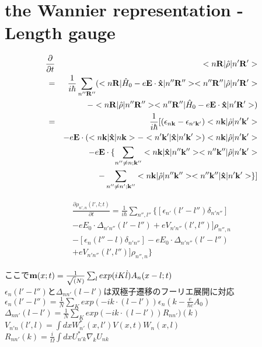 \documentclass[aps,prb,preprint]{revtex4-1}
\begin{document}
\section{the Wannier representation -Length gauge }
\label{sec:WL}
\begin{eqnarray*}
\frac{ \partial }{\partial t } &&<n{\bf R}| \hat{\rho} |n'{\bf R'}> \\
= && \frac{1}{i \hbar}  \sum_{n''{\bf R''}} ( <n{\bf R}| \hat{H}_0 -e{\bf E} \cdot {\bf \hat{x}} |n''{\bf R''}><n''{\bf R''}| \hat{\rho} |n'{\bf R'}> \\
&&- <n{\bf R}| \hat{\rho} |n''{\bf R''}><n''{\bf R''}| \hat{H}_0 -e{\bf E} \cdot {\bf \hat{x}}  |n'{\bf R'}> )\\
= &&\frac{1}{i \hbar} [ (\epsilon_{n{\bf k}}-\epsilon_{n'{\bf k'}}) <n{\bf k}| \hat{\rho} |n'{\bf k'}> \\
&& -e{\bf E} \cdot(<n{\bf k}| {\bf \hat{x}} |n{\bf k}> - <n'{\bf k'}| {\bf \hat{x}} |n'{\bf k'}> ) <n{\bf k}| \hat{\rho} |n'{\bf k'}>\\ 
&&-e{\bf E} \cdot \{ \sum_{n'' \neq n; {\bf k''}} <n{\bf k}| {\bf \hat{x}} |n''{\bf k''}> <n''{\bf k''}| \hat{\rho} |n'{\bf k'}> \\
&&- \sum_{n'' \neq n'; {\bf k''}} <n{\bf k}| \hat{\rho} |n''{\bf k''}> <n''{\bf k''}| {\bf \hat{x}} |n'{\bf k'}> \} ]
\end{eqnarray*}

\begin{eqnarray*}
\frac{ \partial \rho_{n',n}(l', l; t) }{\partial t } = \frac{1}{i \hbar} \sum_{n'',l''} \{ [ \epsilon_{n'}(l'-l'') \delta_{n'n''} ] \\
- eE_0 \cdot \Delta_{n'n''}(l'-l'') + eV_{n'n''}(l', l'')] \rho_{n'',n}\\
- [ \epsilon_{n}(l''-l) \delta_{n'n''} ] - eE_0 \cdot \Delta_{n'n''}(l'-l'') \\
+ eV_{n'n''}(l', l'')] \rho_{n'',n} \}
\end{eqnarray*}

ここで${\bf m}(x;t) = \frac{1}{\sqrt (N)} \sum_{l} exp(iK \dot l) A_n(x-l; t)$\\
$\epsilon_{n}(l'-l'')$と$\Delta_{nn'}(l-l')$は双極子遷移のフーリエ展開に対応\\
$\epsilon_{n}(l'-l'') =\frac{1}{N} \sum_K exp(-ik \cdot (l-l') ) \epsilon_n(k-\frac{e}{\hbar c}A_0)$\\
$\Delta_{nn'}(l-l')=\frac{1}{N}\sum_K exp(-ik \cdot (l-l') ) R_{nn'})(k) $\\
$V_{n'n}(l',l)= \int dx W^*_{n'}(x,l') V(x,t) W_n (x,l) $\\
$R_{nn'}(k) = \frac{i}{\Omega} \int dx U^*_{n'k} \nabla_k U_{nk}$\\
\end{document}
